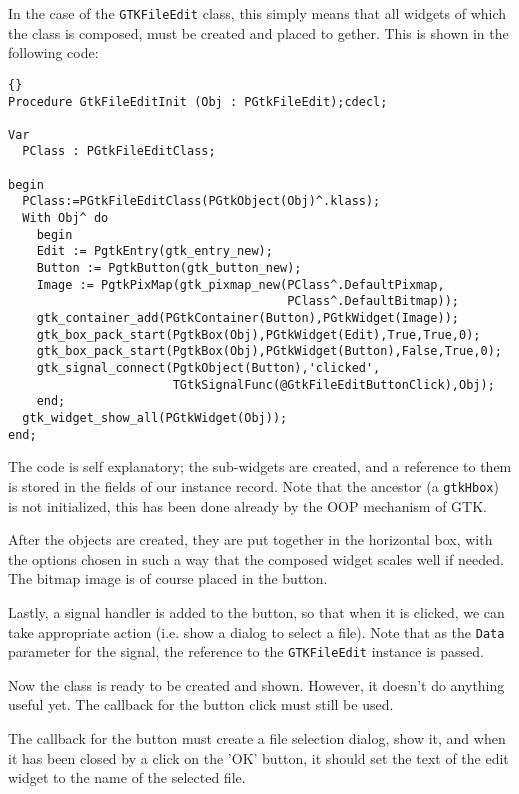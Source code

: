 \documentclass[10pt]{article}
\begin{document}
In the case of the \lstinline|GTKFileEdit| class, this simply means that
all widgets of which the class is composed, must be created and placed to
gether. This is shown in the following code:
\begin{lstlisting}{}
Procedure GtkFileEditInit (Obj : PGtkFileEdit);cdecl;

Var
  PClass : PGtkFileEditClass;

begin
  PClass:=PGtkFileEditClass(PGtkObject(Obj)^.klass);
  With Obj^ do
    begin
    Edit := PgtkEntry(gtk_entry_new);
    Button := PgtkButton(gtk_button_new);
    Image := PgtkPixMap(gtk_pixmap_new(PClass^.DefaultPixmap,
                                       PClass^.DefaultBitmap));
    gtk_container_add(PGtkContainer(Button),PGtkWidget(Image));
    gtk_box_pack_start(PgtkBox(Obj),PGtkWidget(Edit),True,True,0);
    gtk_box_pack_start(PgtkBox(Obj),PGtkWidget(Button),False,True,0);
    gtk_signal_connect(PgtkObject(Button),'clicked',
                       TGtkSignalFunc(@GtkFileEditButtonClick),Obj);
    end;
  gtk_widget_show_all(PGtkWidget(Obj));
end;
\end{lstlisting}
The code is self explanatory; the sub-widgets are created, and a reference
to them is stored in the fields of our instance record. Note that the
ancestor (a \lstinline|gtkHbox|) is not initialized, this has been done 
already by the OOP mechanism of GTK. 

After the objects are created, they are put together in the horizontal 
box, with the options chosen in such a way that the composed widget scales
well if needed. The bitmap image is of course placed in the button.

Lastly, a signal handler is added to the button, so that when it is clicked,
we can take appropriate action (i.e. show a dialog to select a file). 
Note that as the \lstinline|Data| parameter for the signal, the reference 
to the \lstinline|GTKFileEdit| instance is passed.

Now the class is ready to be created and shown. However, it doesn't do
anything useful yet. The callback for the button click must still be used.

The callback for the button must create a file selection dialog, show it,
and when it has been closed by a click on the 'OK' button, it should set
the text of the edit widget to the name of the selected file.
\end{document}
